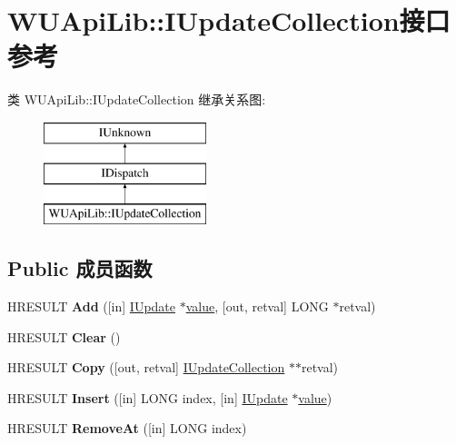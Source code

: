\hypertarget{interface_w_u_api_lib_1_1_i_update_collection}{}\section{W\+U\+Api\+Lib\+:\+:I\+Update\+Collection接口 参考}
\label{interface_w_u_api_lib_1_1_i_update_collection}
类 W\+U\+Api\+Lib\+:\+:I\+Update\+Collection 继承关系图\+:\begin{figure}[H]
\begin{center}
\leavevmode
\includegraphics[height=3.000000cm]{interface_w_u_api_lib_1_1_i_update_collection}
\end{center}
\end{figure}
\subsection*{Public 成员函数}
\begin{DoxyCompactItemize}
\item 
\mbox{\label{interface_w_u_api_lib_1_1_i_update_collection_a13224b00137a6c9a8821497ae0f3f19b}} 
H\+R\+E\+S\+U\+LT {\bfseries Add} (\mbox{[}in\mbox{]} \hyperlink{interface_w_u_api_lib_1_1_i_update}{I\+Update} $\ast$\hyperlink{unionvalue}{value}, \mbox{[}out, retval\mbox{]} L\+O\+NG $\ast$retval)
\item 
\mbox{\label{interface_w_u_api_lib_1_1_i_update_collection_abe3196d0c90e7f7d053a1e73effff0ed}} 
H\+R\+E\+S\+U\+LT {\bfseries Clear} ()
\item 
\mbox{\label{interface_w_u_api_lib_1_1_i_update_collection_ab0ac4a18ba44647586543680f709109b}} 
H\+R\+E\+S\+U\+LT {\bfseries Copy} (\mbox{[}out, retval\mbox{]} \hyperlink{interface_w_u_api_lib_1_1_i_update_collection}{I\+Update\+Collection} $\ast$$\ast$retval)
\item 
\mbox{\label{interface_w_u_api_lib_1_1_i_update_collection_a41b9a9a50387a5c06bbffb688123c51c}} 
H\+R\+E\+S\+U\+LT {\bfseries Insert} (\mbox{[}in\mbox{]} L\+O\+NG index, \mbox{[}in\mbox{]} \hyperlink{interface_w_u_api_lib_1_1_i_update}{I\+Update} $\ast$\hyperlink{unionvalue}{value})
\item 
\mbox{\label{interface_w_u_api_lib_1_1_i_update_collection_a3ee4285f4afe5db4ed9e08243936a607}} 
H\+R\+E\+S\+U\+LT {\bfseries Remove\+At} (\mbox{[}in\mbox{]} L\+O\+NG index)
\end{DoxyCompactItemize}
